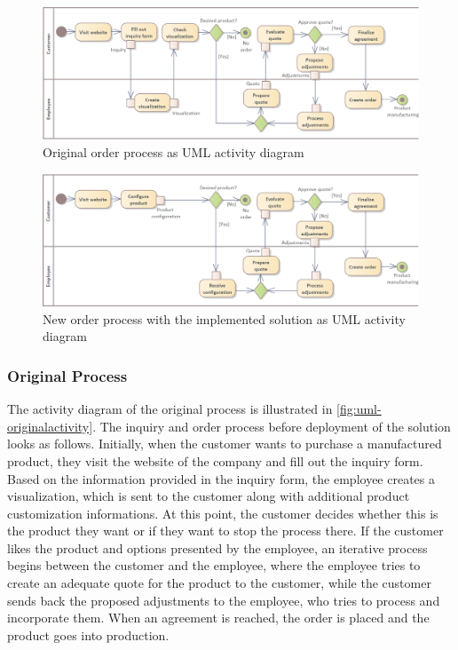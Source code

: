 \begin{landscape}
\begin{figure}[h!]
\centering
\includegraphics[width=0.67\linewidth]{images/uml_originalactivity.png}
\caption{Original order process as UML activity diagram}
\label{fig:uml-originalactivity}
\end{figure}
\begin{figure}[h!]
\centering
\includegraphics[width=0.67\linewidth]{images/uml_newactivity.png}
\caption{New order process with the implemented solution as UML activity diagram}
\label{fig:uml-newactivity}
\end{figure}
\end{landscape}


\subsubsection{Original Process}


The  activity diagram of the original process is illustrated in \autoref{fig:uml-originalactivity}. The inquiry and order process before deployment of the solution looks as follows. Initially, when the customer wants to purchase a manufactured product, they visit the website of the company and fill out the inquiry form. Based on the information provided in the inquiry form, the employee creates a visualization, which is sent to the customer along with additional product customization informations. At this point, the customer decides whether this is the product they want or if they want to stop the process there. If the customer likes the product and options presented by the employee, an iterative process begins between the customer and the employee, where the employee tries to create an adequate quote for the product to the customer, while the customer sends back the proposed adjustments to the employee, who tries to process and incorporate them. When an agreement is reached, the order is placed and the product goes into production. 


